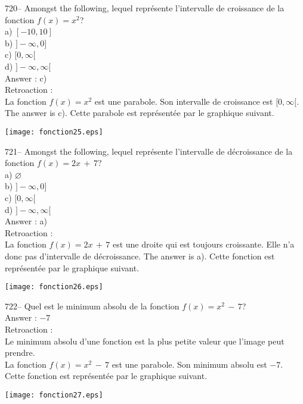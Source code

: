 ﻿\documentclass[letterpaper, 12pt]{article}
\begin{document}
720-- Amongst the following, lequel repr\'esente l'intervalle de
croissance de la fonction $f(x)=x^{2}$?\\
a) $[-10,10]$\\
b) $]-\infty,0]$\\
c) $[0,\infty[$\\
d) $]-\infty,\infty[$\\

Answer : c)\\

Retroaction : \\
La fonction $f(x)=x^{2}$ est une parabole.  Son intervalle de croissance est
$[0,\infty[$.  The answer is c).  Cette parabole est repr\'esent\'ee par
le graphique suivant.\\
    \begin{center}
    \texttt{[image: fonction25.eps]}
    \end{center}


721-- Amongst the following, lequel repr\'esente l'intervalle de
d\'ecroissance de la fonction $f(x)=2x\,+\,7$?\\
a) $\varnothing$\\
b) $]-\infty,0]$\\
c) $[0,\infty[$\\
d) $]-\infty,\infty[$\\

Answer : a)\\

Retroaction : \\
La fonction $f(x)=2x\,+\,7$ est une droite qui est toujours croissante.
Elle n'a donc pas d'intervalle de d\'ecroissance.  The answer is a).
Cette fonction est repr\'esent\'ee par le graphique suivant.\\
    \begin{center}
    \texttt{[image: fonction26.eps]}
    \end{center}


722-- Quel est le minimum absolu de la fonction $f(x)=x^{2}\,-\,7$?\\

Answer : $-7$\\

Retroaction : \\
Le minimum absolu d'une fonction est la plus petite valeur que l'image peut
prendre.\\
La fonction $f(x)=x^{2}\,-\,7$ est une parabole.  Son minimum absolu est
$-7$.  Cette fonction est repr\'esent\'ee par le graphique suivant.\\
    \begin{center}
    \texttt{[image: fonction27.eps]}
    \end{center}
\end{document}
